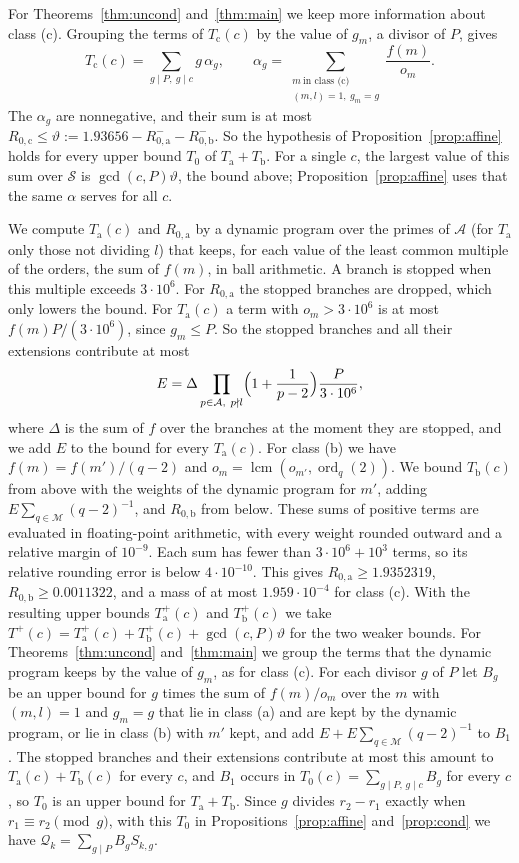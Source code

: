 \documentclass[11pt]{amsart}
\theoremstyle{definition}
\theoremstyle{remark}
\numberwithin{equation}{section}
\newcommand{\ord}{\operatorname{ord}}
\newcommand{\lcm}{\operatorname{lcm}}
\newcommand{\ROa}{1.9352319}%
\newcommand{\ROb}{0.0011322}%
\newcommand{\Cmass}{1.959\cdot10^{-4}}%
\begin{document}
For Theorems~\ref{thm:uncond} and~\ref{thm:main} we keep more information about class (c). Grouping the terms of $T_{\mathrm c}(c)$ by the value of $g_m$, a divisor of $P$, gives
\[
T_{\mathrm c}(c)=\sum_{g\mid P,\ g\mid c}g\,\alpha_g,\qquad\alpha_g=\sum_{\substack{m\ \text{in class (c)}\\(m,l)=1,\ g_m=g}}\frac{f(m)}{o_m}.
\]
The $\alpha_g$ are nonnegative, and their sum is at most $R_{0,\mathrm c}\le\vartheta:=1.93656-R_{0,\mathrm a}^--R_{0,\mathrm b}^-$. So the hypothesis of Proposition~\ref{prop:affine} holds for every upper bound $T_0$ of $T_{\mathrm a}+T_{\mathrm b}$. For a single $c$, the largest value of this sum over $\mathcal S$ is $\gcd(c,P)\vartheta$, the bound above; Proposition~\ref{prop:affine} uses that the same $\alpha$ serves for all $c$.

We compute $T_{\mathrm a}(c)$ and $R_{0,\mathrm a}$ by a dynamic program over the primes of $\mathcal A$ (for $T_{\mathrm a}$ only those not dividing $l$) that keeps, for each value of the least common multiple of the orders, the sum of $f(m)$, in ball arithmetic. A branch is stopped when this multiple exceeds $3\cdot10^6$. For $R_{0,\mathrm a}$ the stopped branches are dropped, which only lowers the bound. For $T_{\mathrm a}(c)$ a term with $o_m>3\cdot10^6$ is at most $f(m)P/(3\cdot10^6)$, since $g_m\le P$. So the stopped branches and all their extensions contribute at most
\[
E=\Delta\prod_{p\in\mathcal A,\ p\nmid l}\Bigl(1+\frac1{p-2}\Bigr)\frac P{3\cdot10^6},
\]
where $\Delta$ is the sum of $f$ over the branches at the moment they are stopped, and we add $E$ to the bound for every $T_{\mathrm a}(c)$. For class (b) we have $f(m)=f(m')/(q-2)$ and $o_m=\lcm(o_{m'},\ord_q(2))$. We bound $T_{\mathrm b}(c)$ from above with the weights of the dynamic program for $m'$, adding $E\sum_{q\in\mathcal M}(q-2)^{-1}$, and $R_{0,\mathrm b}$ from below. These sums of positive terms are evaluated in floating-point arithmetic, with every weight rounded outward and a relative margin of $10^{-9}$. Each sum has fewer than $3\cdot10^6+10^3$ terms, so its relative rounding error is below $4\cdot10^{-10}$. This gives $R_{0,\mathrm a}\ge\ROa$, $R_{0,\mathrm b}\ge\ROb$, and a mass of at most $\Cmass$ for class (c). With the resulting upper bounds $T_{\mathrm a}^+(c)$ and $T_{\mathrm b}^+(c)$ we take $T^+(c)=T_{\mathrm a}^+(c)+T_{\mathrm b}^+(c)+\gcd(c,P)\vartheta$ for the two weaker bounds. For Theorems~\ref{thm:uncond} and~\ref{thm:main} we group the terms that the dynamic program keeps by the value of $g_m$, as for class (c). For each divisor $g$ of $P$ let $B_g$ be an upper bound for $g$ times the sum of $f(m)/o_m$ over the $m$ with $(m,l)=1$ and $g_m=g$ that lie in class (a) and are kept by the dynamic program, or lie in class (b) with $m'$ kept, and add $E+E\sum_{q\in\mathcal M}(q-2)^{-1}$ to $B_1$. The stopped branches and their extensions contribute at most this amount to $T_{\mathrm a}(c)+T_{\mathrm b}(c)$ for every $c$, and $B_1$ occurs in $T_0(c)=\sum_{g\mid P,\,g\mid c}B_g$ for every $c$, so $T_0$ is an upper bound for $T_{\mathrm a}+T_{\mathrm b}$. Since $g$ divides $r_2-r_1$ exactly when $r_1\equiv r_2\pmod g$, with this $T_0$ in Propositions~\ref{prop:affine} and~\ref{prop:cond} we have $\mathcal Q_k=\sum_{g\mid P}B_gS_{k,g}$.
\end{document}
